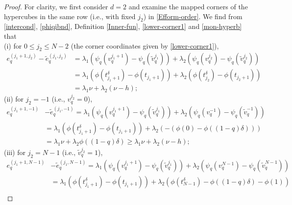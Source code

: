 \documentclass[10pt,reqno,final]{amsart}
\theoremstyle{remark}
\theoremstyle{definition}
\begin{document}
\begin{proof}
For clarity, we first consider $d=2$ and examine the mapped corners of the hypercubes in the same row (i.e., with fixed $j_2$) in  \eqref{Efform-order}. We find from
 \eqref{intercond}, \eqref{phiqibnd}, Definition \ref{Inner-fun},
 \eqref{lower-corner1} and \eqref{mon-hyperb} that\\[4pt] 
 (i) for $0\leq j_2\leq N-2$  (the corner coordinates given by \eqref{lower-corner1}),  
\begin{equation}\label{sepneighbsupercubes0}
\begin{split}
 e_q^{(j_1+1,j_2)}-\tilde e_q^{(j_1,j_2)}&=
\lambda_1(\psi_q(v_q^{j_1+1})-\psi_q(\tilde v_q^{j_1}))
+\lambda_2(\psi_q( v_q^{j_2})-\psi_q(\tilde v_q^{j_2}))
\\&
=\lambda_1(\phi(t_{j_1+1}^\delta)-\phi(t_{j_1+1}))
+\lambda_2(\phi(t_{j_2}^\delta)-\phi(t_{j_2+1}))
\\&=\lambda_1\nu +\lambda_2 (\nu-h);
\end{split}
\end{equation}
(ii) for $j_2=-1$ (i.e., $v_q^{j_2}=0$),   
\begin{equation}\label{sepneighbsupercubes-1}
\begin{split}
 e_q^{(j_1+1,-1)}&-\tilde e_q^{(j_1,-1)}
=\lambda_1(\psi_q( v_q^{j_1+1})-\psi_q(\tilde v_q^{j_1}))
+\lambda_2(\psi_q( v_q^{-1})-\psi_q(\tilde v_q^{-1}))
\\&
=\lambda_1(\phi(t_{j_1+1}^\delta)-\phi(t_{j_1+1}))
+\lambda_2(-(\phi(0)-\phi((1-q)\delta)))
\\& =\lambda_1\nu +\lambda_2 \phi((1-q)\delta)\geq \lambda_1\nu +\lambda_2 (\nu-h);
\end{split}
\end{equation}
 (iii)
for 
$j_2=N-1$ (i.e., $\tilde v_q^{j_2}=1$), 
\begin{equation}\label{sepneighbsupercubesJ-1}
\begin{split}
 e_q^{(j_1+1,N-1)} &-\tilde e_q^{(j_1,N-1)}
=\lambda_1(\psi_q( v_q^{j_1+1})-\psi_q(\tilde v_q^{j_1}))
+\lambda_2(\psi_q( v_q^{N-1})-\psi_q(\tilde v_q^{N-1}))
\\&
=\lambda_1(\phi(t_{j_1+1}^\delta)-\phi(t_{j_1+1}))
+\lambda_2(\phi(t_{N-1}^{\delta})-\phi((1-q)\delta)-\phi(1))
\\& 

\end{split}
\end{equation}
\end{proof}
\end{document}
